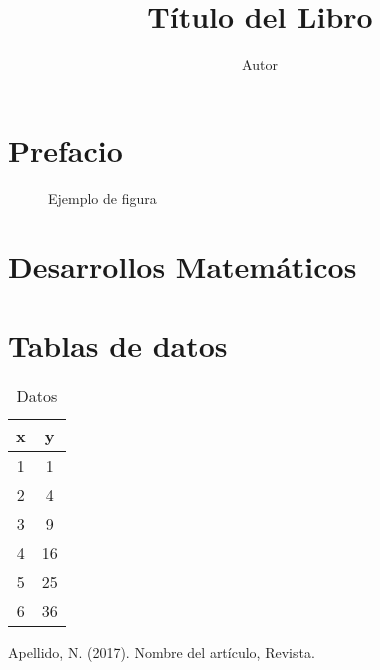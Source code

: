 \documentclass[11pt,a4paper,twoside,openright]{book}
\author{Autor}
\title{Título del Libro}
\begin{document}
\renewcommand{\tablename}{Tabla}
\renewcommand{\listtablename}{Índice de Tablas}



\frontmatter

\tableofcontents
\listoffigures
\listoftables

\chapter{Prefacio}


\mainmatter


\begin{figure}
\caption{Ejemplo de figura}
\label{fig:intro}
\end{figure}





\appendix
\chapter{Desarrollos Matemáticos}

\chapter{Tablas de datos}

\begin{table}[ht]
\centering
\begin{tabular}{c | c}
x & y \\ \hline
1 & 1  \\
2 & 4  \\
3 & 9  \\
4 & 16 \\
5 & 25 \\
6 & 36 \\
\end{tabular}
\caption{Datos}
\end{table}

\backmatter




\begin{thebibliography}{3}
 Apellido, N. (2017). Nombre del artículo, Revista.
\end{thebibliography}
\end{document}
